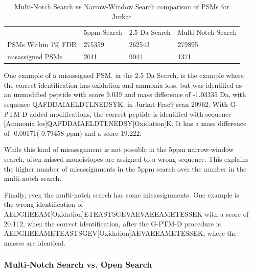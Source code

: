 \documentclass[journal=jprobs,manuscript=article]{achemso}
\begin{document}
\begin{table}[]
\centering
\caption{Multi-Notch Search vs Narrow-Window Search comparison of PSMs for Jurkat}
\label{tbl:singleVsMultiNotch}
\begin{tabular}{llll}
                    & 5ppm Search & 2.5 Da Search & Multi-Notch Search \\
PSMs Within 1\% FDR & 275359      & 262543        & 279895       \\
misassigned PSMs    & 2041           & 9041          & 1371            \\
\end{tabular}
\end{table}

One example of a misassigned PSM, in the 2.5 Da Search, is the example where the correct identification has oxidation and ammonia loss, but was identified as an unmodified peptide with score 9.039 and mass difference of -1.03335 Da, with sequence QAFDDAIAELDTLNEDSYK, in Jurkat Frac9 scan 20962.
With G-PTM-D added modifications, the correct peptide is identified with sequence [Ammonia los]QAFDDAIAELDTLNEDSY[Oxidation]K. It has a mass difference of -0.00171(-0.79458 ppm) and a score 19.222.

While this kind of misassgnment is not possible in the 5ppm narrow-window search, often missed monoistopes are assigned to a wrong sequence.
This explains the higher number of misassignments in the 5ppm search over the number in the multi-notch search.

Finally, even the multi-notch search has some misassignments.
One example is the wrong identification of AEDGHEEAM[Oxidation]ETEASTSGEVAEVAEEAMETESSEK with a score of 20.112, when the correct identification, after the G-PTM-D procedure is AEDGHEEAMETEASTSGEV[Oxidation]AEVAEEAMETESSEK, where the masses are identical. 


\subsubsection{Multi-Notch Search vs. Open Search}
\end{document}
